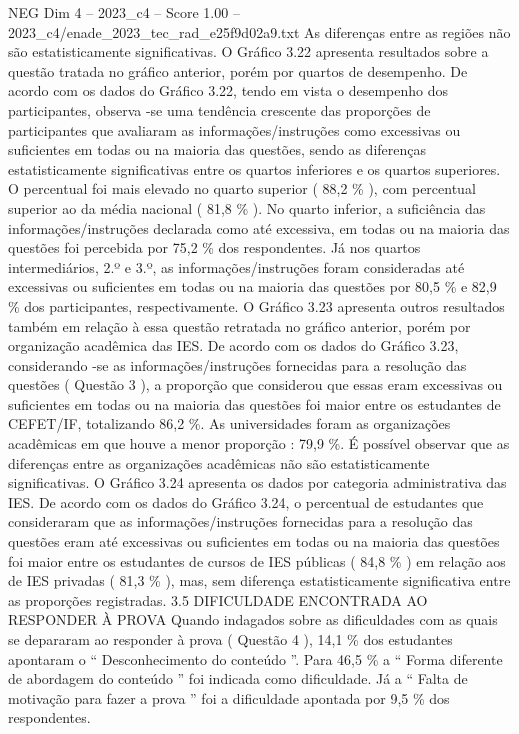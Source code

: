 \begin{textsample}{NEG Dim 4 – 2023\_c4 – Score 1.00 – 2023\_c4/enade\_2023\_tec\_rad\_e25f9d02a9.txt}
As diferenças entre as regiões não são estatisticamente significativas.
O Gráfico 3.22 apresenta resultados sobre a questão tratada no gráfico anterior, porém por quartos de desempenho.
De acordo com os dados do Gráfico 3.22, tendo em vista o desempenho dos participantes, observa -se uma tendência crescente das proporções de participantes que avaliaram as informações/instruções como excessivas ou suficientes em todas ou na maioria das questões, sendo as diferenças estatisticamente significativas entre os quartos inferiores e os quartos superiores.
O percentual foi mais elevado no quarto superior ( 88,2 \% ), com percentual superior ao da média nacional ( 81,8 \% ).
No quarto inferior, a suficiência das informações/instruções declarada como até excessiva, em todas ou na maioria das questões foi percebida por 75,2 \% dos respondentes.
Já nos quartos intermediários, 2.º e 3.º, as informações/instruções foram consideradas até excessivas ou suficientes em todas ou na maioria das questões por 80,5 \% e 82,9 \% dos participantes, respectivamente.
O Gráfico 3.23 apresenta outros resultados também em relação à essa questão retratada no gráfico anterior, porém por organização acadêmica das IES.
De acordo com os dados do Gráfico 3.23, considerando -se as informações/instruções fornecidas para a resolução das questões ( Questão 3 ), a proporção que considerou que essas eram excessivas ou suficientes em todas ou na maioria das questões foi maior entre os estudantes de CEFET/IF, totalizando 86,2 \%.
As universidades foram as organizações acadêmicas em que houve a menor proporção : 79,9 \%.
É possível observar que as diferenças entre as organizações acadêmicas não são estatisticamente significativas.
O Gráfico 3.24 apresenta os dados por categoria administrativa das IES.
De acordo com os dados do Gráfico 3.24, o percentual de estudantes que consideraram que as informações/instruções fornecidas para a resolução das questões eram até excessivas ou suficientes em todas ou na maioria das questões foi maior entre os estudantes de cursos de IES públicas ( 84,8 \% ) em relação aos de IES privadas ( 81,3 \% ), mas, sem diferença estatisticamente significativa entre as proporções registradas. 3.5 DIFICULDADE ENCONTRADA AO RESPONDER À PROVA Quando indagados sobre as dificuldades com as quais se depararam ao responder à prova ( Questão 4 ), 14,1 \% dos estudantes apontaram o “ Desconhecimento do conteúdo ”.
Para 46,5 \% a “ Forma diferente de abordagem do conteúdo ” foi indicada como dificuldade.
Já a “ Falta de motivação para fazer a prova ” foi a dificuldade apontada por 9,5 \% dos respondentes.

\end{textsample}
